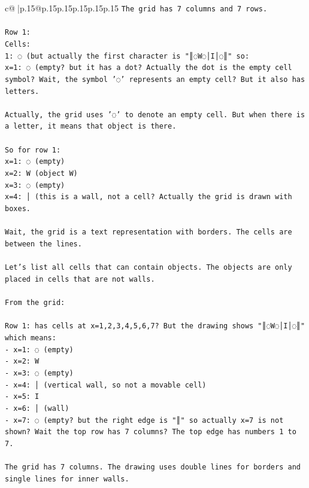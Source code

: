 \documentclass{article}
\begin{document}
{\begin{supertabular}{c@{$\;$}|p{.15\linewidth}@{}p{.15\linewidth}p{.15\linewidth}p{.15\linewidth}p{.15\linewidth}p{.15\linewidth}}
{{{\texttt{The grid has 7 columns and 7 rows.} \\
\\ 
\texttt{Row 1: } \\
\texttt{Cells: } \\
\texttt{1: ◌ (but actually the first character is "║◌W◌│I│◌║" so:} \\
\texttt{x=1: ◌ (empty? but it has a dot? Actually the dot is the empty cell symbol? Wait, the symbol '◌' represents an empty cell? But it also has letters.} \\
\\ 
\texttt{Actually, the grid uses '◌' to denote an empty cell. But when there is a letter, it means that object is there.} \\
\\ 
\texttt{So for row 1:} \\
\texttt{x=1: ◌ (empty)} \\
\texttt{x=2: W (object W)} \\
\texttt{x=3: ◌ (empty)} \\
\texttt{x=4: │ (this is a wall, not a cell? Actually the grid is drawn with boxes.} \\
\\ 
\texttt{Wait, the grid is a text representation with borders. The cells are between the lines.} \\
\\ 
\texttt{Let's list all cells that can contain objects. The objects are only placed in cells that are not walls.} \\
\\ 
\texttt{From the grid:} \\
\\ 
\texttt{Row 1: has cells at x=1,2,3,4,5,6,7? But the drawing shows "║◌W◌│I│◌║" which means:} \\
\texttt{{-} x=1: ◌ (empty)} \\
\texttt{{-} x=2: W} \\
\texttt{{-} x=3: ◌ (empty)} \\
\texttt{{-} x=4: │ (vertical wall, so not a movable cell)} \\
\texttt{{-} x=5: I} \\
\texttt{{-} x=6: │ (wall)} \\
\texttt{{-} x=7: ◌ (empty? but the right edge is "║" so actually x=7 is not shown? Wait the top row has 7 columns? The top edge has numbers 1 to 7.} \\
\\ 
\texttt{The grid has 7 columns. The drawing uses double lines for borders and single lines for inner walls.} \\
}}}
\end{supertabular}}
\end{document}
